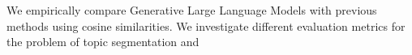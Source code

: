 
We empirically compare Generative Large Language Models with previous methods using cosine similarities. We investigate different evaluation metrics for the problem of topic segmentation and 